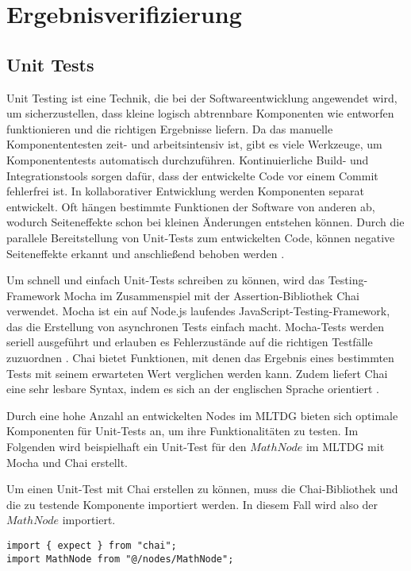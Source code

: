 
\chapter{Ergebnisverifizierung}

\section{Unit Tests}

Unit Testing ist eine Technik, die bei der Softwareentwicklung angewendet wird, um sicherzustellen, dass kleine logisch abtrennbare Komponenten wie entworfen funktionieren und die richtigen Ergebnisse liefern. Da das manuelle Komponententesten zeit- und arbeitsintensiv ist, gibt es viele Werkzeuge, um Komponententests automatisch durchzuführen. Kontinuierliche Build- und Integrationstools sorgen dafür, dass der entwickelte Code vor einem Commit fehlerfrei ist. In kollaborativer Entwicklung werden Komponenten separat entwickelt. Oft hängen bestimmte Funktionen der Software von anderen ab, wodurch Seiteneffekte schon bei kleinen Änderungen entstehen können. Durch die parallele Bereitstellung von Unit-Tests zum entwickelten Code, können negative Seiteneffekte erkannt und anschließend behoben werden \cite{Dalton2018}.

Um schnell und einfach Unit-Tests schreiben zu können, wird das Testing-Framework Mocha im Zusammenspiel mit der Assertion-Bibliothek Chai verwendet. Mocha ist ein auf Node.js laufendes JavaScript-Testing-Framework, das die Erstellung von asynchronen Tests einfach macht. Mocha-Tests werden seriell ausgeführt und erlauben es Fehlerzustände auf die richtigen Testfälle zuzuordnen \cite{mocha}. Chai bietet Funktionen, mit denen das Ergebnis eines bestimmten Tests mit seinem erwarteten Wert verglichen werden kann. Zudem liefert Chai eine sehr lesbare Syntax, indem es sich an der englischen Sprache orientiert \cite{chai}.

Durch eine hohe Anzahl an entwickelten Nodes im \ac{MLTDG} bieten sich optimale Komponenten für Unit-Tests an, um ihre Funktionalitäten zu testen. Im Folgenden wird beispielhaft ein Unit-Test für den $MathNode$ im \ac{MLTDG} mit Mocha und Chai erstellt.

Um einen Unit-Test mit Chai erstellen zu können, muss die Chai-Bibliothek und die zu testende Komponente importiert werden. In diesem Fall wird also der $MathNode$ importiert.

\begin{lstlisting}[caption=Unit-Test: Import,label=unit1]
import { expect } from "chai";
import MathNode from "@/nodes/MathNode";
\end{lstlisting}

